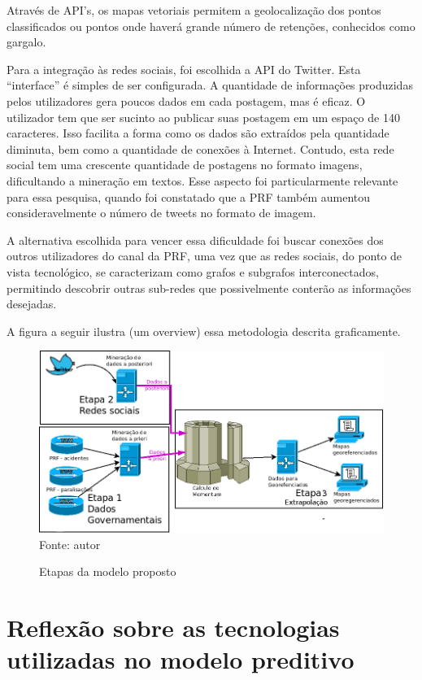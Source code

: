 Através de API's, os mapas vetoriais permitem a geolocalização dos pontos classificados ou pontos onde haverá grande número de retenções, conhecidos como gargalo.

Para a integração às redes sociais, foi escolhida a API do Twitter. Esta ``interface'' é simples de ser configurada. A quantidade de informações produzidas pelos utilizadores gera poucos dados em cada postagem, mas é eficaz. O utilizador tem que ser sucinto ao publicar suas postagem em um espaço de 140 caracteres. Isso facilita a forma como os dados são extraídos pela quantidade diminuta, bem como a quantidade de conexões à Internet. Contudo, esta rede social tem uma crescente quantidade de postagens no formato imagens, dificultando a mineração em textos. Esse aspecto foi particularmente relevante para essa pesquisa, quando foi constatado que a PRF também aumentou consideravelmente o número de tweets no formato de imagem. 

A alternativa escolhida para vencer essa dificuldade foi buscar conexões dos outros utilizadores do canal da PRF, uma vez que as redes sociais, do ponto de vista tecnológico, se caracterizam como grafos e subgrafos interconectados, permitindo descobrir outras sub-redes que possivelmente conterão as informações desejadas. 

A figura a seguir ilustra (um overview) essa metodologia descrita graficamente.

\begin{figure}[ht]
\centering
\caption{Etapas da modelo proposto}
\includegraphics[width=135mm, height=75	mm]{Figuras/Metodologia/metodologiaGeral2.png}\\
\tiny Fonte: autor
\end{figure}

\section{Reflexão sobre as tecnologias utilizadas no modelo preditivo}\label{result}

